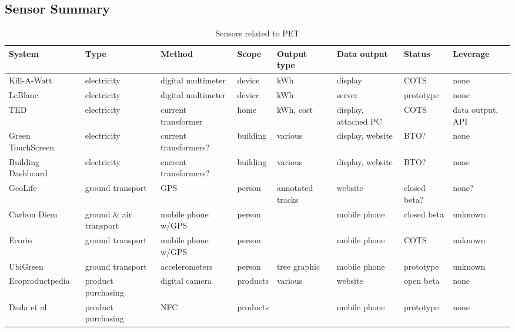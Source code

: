 \subsection{Sensor Summary}

\begin{table}[htbp]
	\begin{center}
		\begin{minipage}{\textwidth}
		\scriptsize
		\begin{tabular}{| p{2.2cm} || p{1.5cm} | p{2cm} | l | p{1.5cm} | p{1.6cm} | p{1.5cm} | p{1.5cm} |}
			\hline
			System & Type & Method & Scope & Output type & Data output & Status & Leverage \\ \hline \hline
			
			Kill-A-Watt & electricity & digital multimeter & device & kWh & display & COTS & none \\ \hline
			
			LeBlanc & electricity & digital multimeter & device & kWh & server & prototype & none \\ \hline
			
			TED & electricity & current transformer & home & kWh, cost & display, attached PC & COTS & data output, API \\ \hline
			Green TouchScreen & electricity & current transformers? & building & various & display, website & BTO? & none \\ \hline
			
			Building Dashboard & electricity & current transformers? & building & various & display, website & BTO? & none \\ \hline
			
			GeoLife & ground transport & GPS & person & annotated tracks & website & closed beta? & none? \\ \hline
			
			Carbon Diem & ground \& air transport & mobile phone w/GPS & person & \COtwo & mobile phone & closed beta & unknown \\ \hline
			
			Ecorio & ground transport & mobile phone w/GPS & person & \COtwo & mobile phone & COTS & unknown \\ \hline
			
			UbiGreen & ground transport & accelerometers & person & tree graphic & mobile phone & prototype & unknown \\ \hline
			
			Ecoproductpedia & product purchasing & digital camera & products & various & website & open beta & none \\ \hline
			
			Dada et al & product purchasing & NFC & products & \COtwo & mobile phone & prototype & none \\ \hline
			
		\end{tabular}
		\end{minipage}
	\caption{Sensors related to PET}
	\label{tab:sensor-synthesis}
	\end{center}
\end{table}

